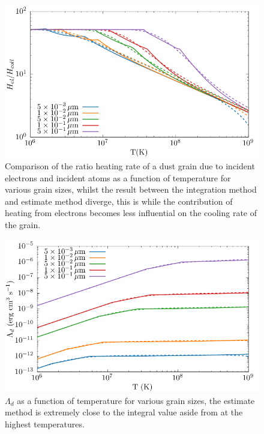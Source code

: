 \begin{figure}
  \centering
  \includegraphics{assets/grain-transparency/contrib-comp.pdf}
  \caption[Electron transparency method accuracy - $H_{el}/H_{coll}$]{Comparison of the ratio heating rate of a dust grain due to incident electrons and incident atoms as a function of temperature for various grain sizes, whilst the result between the integration method and estimate method diverge, this is while the contribution of heating from electrons becomes less influential on the cooling rate of the grain.}
  \label{fig:contribution-int-vs-est}
\end{figure}

\begin{figure}
  \centering
  \includegraphics{assets/grain-transparency/lambda-comp.pdf}
  \caption[Electron transparency method accuracy - $\Lambda_d$]{$\Lambda_d$ as a function of temperature for various grain sizes, the estimate method is extremely close to the integral value aside from at the highest temperatures.}
  \label{fig:lambda-comp-int-vs-est}
\end{figure}


